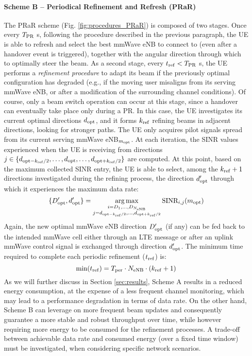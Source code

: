 \documentclass[conference]{IEEEtran}
\DeclareMathOperator*{\argmax}{arg\,max}
\def\beq{\begin{equation}}
\def\eeq{\end{equation}}
\begin{document}
\paragraph{\textbf{Scheme B -- Periodical Refinement and Refresh (PRaR)}}
The PRaR scheme (Fig. \ref{fig:procedures_PRaR}) is composed of two  stages. 
Once every $T_{\rm PR}$ s, following the procedure described in the previous paragraph, the UE is able to refresh and select the best mmWave eNB to connect to (even after a handover event is triggered), together with the  angular direction through which to optimally steer the beam.
As a second stage, every ${t_{\rm ref} < T_{\rm PR}}$ s, the UE performs a \emph{refinement procedure} to adapt its beam if the previously optimal configuration has degraded (e.g., if the moving user misaligns from its serving mmWave eNB, or after a modification of the surrounding channel conditions). 
Of course, only a beam switch operation can occur at this stage, since a handover can eventually take place only during a PR.
In this case, the UE investigates its current optimal directions $d_{\rm opt}$, and it forms $k_{\rm ref}$ refining beams in adjacent directions, looking for stronger paths. The UE only acquires pilot signals spread from its current serving mmWave eNB$_{m_{\rm opt}}$.
At each iteration, the SINR values experienced when the UE is receiving from directions ${j\in \{d_{{\rm opt}-k_{\rm ref}/2 },\dots,d_{\rm opt}, \dots,d_{{\rm opt}+k_{\rm ref}/2 }\} }$ are computed.
At this point, based on the maximum collected SINR  entry, the UE is able to select, among the $k_{\rm ref}+1$ directions investigated during the refining process, the direction $d_{\rm opt}'$ through which it experiences the maximum data rate: 
 \beq
\{D_{\rm opt}', d_{\rm opt}' \} = \argmax_{\substack{ i =D_1,\dots,D_{N_{\rm eNB}} \\ j=d_{{\rm opt}-k_{\rm ref}/2 },\dots,d_{{\rm opt}+k_{\rm ref}/2 } }} \text{SINR}_{i,j}(m_{\rm opt})
\label{eq:max_SINR}
\eeq
 Again, the new optimal mmWave eNB direction $D_{\rm opt}'$ (if any) can be fed back to the intended  mmWave cell either through an LTE message or after an uplink mmWave control signal is exchanged through direction $d_{\rm opt}'$. The minimum time required to complete each periodic refinement ($t_{\rm ref}$) is:
\beq
\min(t_{\rm ref}) = T_{\rm per} \cdot N_{\rm eNB} \cdot (k_{\rm ref} + 1)
\label{eq:t_ref}
\eeq
As we will further discuss in Section \ref{sec:results}, Scheme A results in a reduced energy consumption, at the expense of a less frequent channel monitoring, which may lead to a performance degradation in terms of  data rate. 
On the other hand, Scheme B can leverage on more frequent beam updates and consequently guarantee a more stable and robust throughput over time, while however requiring more energy to be consumed for the  refinement processes.
A trade-off between achievable data rate and consumed energy (over a fixed time window) must be investigated, when considering specific network scenarios.
\end{document}
